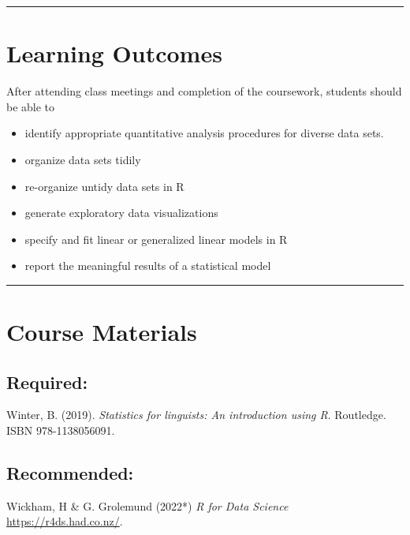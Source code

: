 \documentclass[
  letterpaper,
  DIV=11,
  numbers=noendperiod]{scrartcl}
\begin{document}
\begin{center}\rule{0.5\linewidth}{0.5pt}\end{center}

\hypertarget{learning-outcomes}{%
\section{Learning Outcomes}\label{learning-outcomes}}

After attending class meetings and completion of the coursework,
students should be able to

\begin{itemize}
\item
  identify appropriate quantitative analysis procedures for diverse data
  sets.
\item
  organize data sets tidily
\item
  re-organize untidy data sets in R
\item
  generate exploratory data visualizations
\item
  specify and fit linear or generalized linear models in R
\item
  report the meaningful results of a statistical model
\end{itemize}

\begin{center}\rule{0.5\linewidth}{0.5pt}\end{center}

\hypertarget{course-materials}{%
\section{Course Materials}\label{course-materials}}

\hypertarget{required}{%
\subsection{Required:}\label{required}}

Winter, B. (2019). \emph{Statistics for linguists: An introduction using
R}. Routledge. ISBN 978-1138056091.

\hypertarget{recommended}{%
\subsection{Recommended:}\label{recommended}}

Wickham, H \& G. Grolemund (2022*) \emph{R for Data Science}
\url{https://r4ds.had.co.nz/}.
\end{document}
